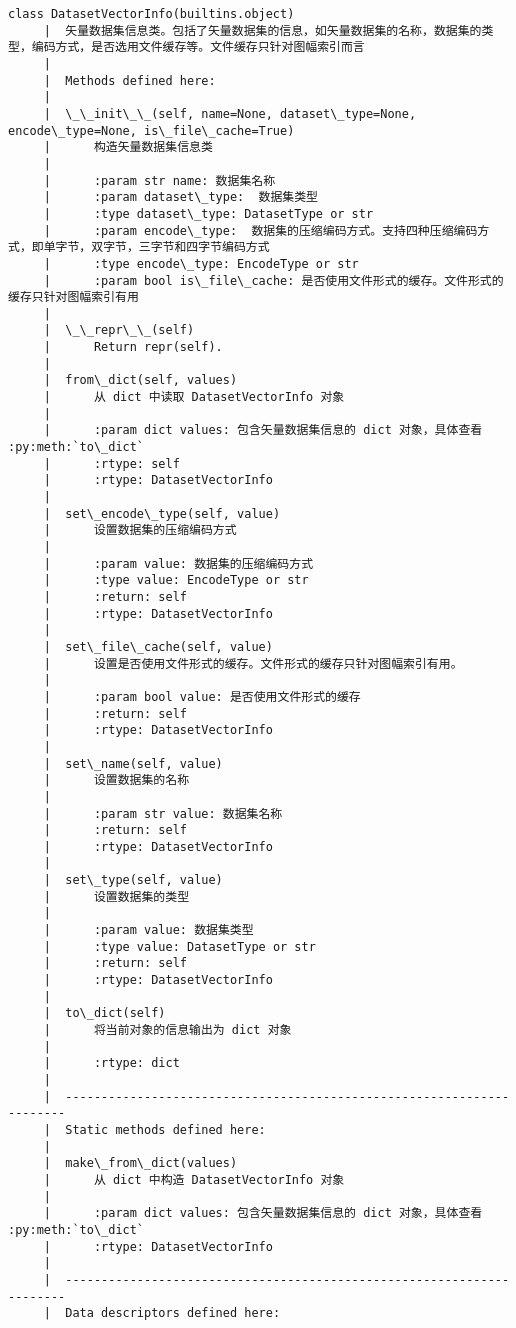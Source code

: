 \documentclass[11pt]{article}
\begin{document}
\begin{Verbatim}[commandchars=\\\{\}]
    class DatasetVectorInfo(builtins.object)
     |  矢量数据集信息类。包括了矢量数据集的信息，如矢量数据集的名称，数据集的类型，编码方式，是否选用文件缓存等。文件缓存只针对图幅索引而言
     |  
     |  Methods defined here:
     |  
     |  \_\_init\_\_(self, name=None, dataset\_type=None, encode\_type=None, is\_file\_cache=True)
     |      构造矢量数据集信息类
     |      
     |      :param str name: 数据集名称
     |      :param dataset\_type:  数据集类型
     |      :type dataset\_type: DatasetType or str
     |      :param encode\_type:  数据集的压缩编码方式。支持四种压缩编码方式，即单字节，双字节，三字节和四字节编码方式
     |      :type encode\_type: EncodeType or str
     |      :param bool is\_file\_cache: 是否使用文件形式的缓存。文件形式的缓存只针对图幅索引有用
     |  
     |  \_\_repr\_\_(self)
     |      Return repr(self).
     |  
     |  from\_dict(self, values)
     |      从 dict 中读取 DatasetVectorInfo 对象
     |      
     |      :param dict values: 包含矢量数据集信息的 dict 对象，具体查看 :py:meth:`to\_dict`
     |      :rtype: self
     |      :rtype: DatasetVectorInfo
     |  
     |  set\_encode\_type(self, value)
     |      设置数据集的压缩编码方式
     |      
     |      :param value: 数据集的压缩编码方式
     |      :type value: EncodeType or str
     |      :return: self
     |      :rtype: DatasetVectorInfo
     |  
     |  set\_file\_cache(self, value)
     |      设置是否使用文件形式的缓存。文件形式的缓存只针对图幅索引有用。
     |      
     |      :param bool value: 是否使用文件形式的缓存
     |      :return: self
     |      :rtype: DatasetVectorInfo
     |  
     |  set\_name(self, value)
     |      设置数据集的名称
     |      
     |      :param str value: 数据集名称
     |      :return: self
     |      :rtype: DatasetVectorInfo
     |  
     |  set\_type(self, value)
     |      设置数据集的类型
     |      
     |      :param value: 数据集类型
     |      :type value: DatasetType or str
     |      :return: self
     |      :rtype: DatasetVectorInfo
     |  
     |  to\_dict(self)
     |      将当前对象的信息输出为 dict 对象
     |      
     |      :rtype: dict
     |  
     |  ----------------------------------------------------------------------
     |  Static methods defined here:
     |  
     |  make\_from\_dict(values)
     |      从 dict 中构造 DatasetVectorInfo 对象
     |      
     |      :param dict values: 包含矢量数据集信息的 dict 对象，具体查看 :py:meth:`to\_dict`
     |      :rtype: DatasetVectorInfo
     |  
     |  ----------------------------------------------------------------------
     |  Data descriptors defined here:

\end{Verbatim}
\end{document}
